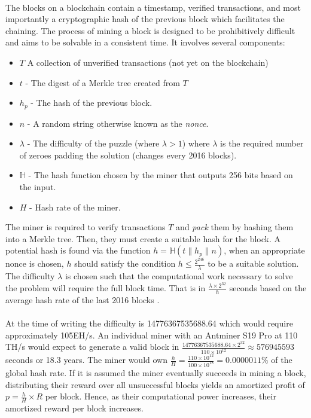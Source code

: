 \paragraph{} The blocks on a blockchain contain a timestamp, verified transactions, and most importantly a cryptographic hash of the previous block which facilitates the chaining. The process of mining a block is designed to be prohibitively difficult and aims to be solvable in a consistent time. It involves several components:

\begin{itemize}
  \item $T$ A collection of unverified transactions (not yet on the blockchain)
  \item $t$ - The digest of a Merkle tree created from $T$
  \item $h_p$ - The hash of the previous block.
  \item $n$ - A random string otherwise known as the \textit{nonce}.
  \item $\lambda$ - The difficulty of the puzzle (where $\lambda > 1$) where $\lambda$ is the required number of zeroes padding the solution (changes every 2016 blocks).
  \item $\mathbb{H}$ - The hash function chosen by the miner that outputs 256 bits based on the input.
  \item $H$ - Hash rate of the miner.
\end{itemize}

\noindent The miner is required to verify transactions $T$ and \textit{pack} them by hashing them into a Merkle tree. Then, they must create a suitable hash for the block. A potential hash is found via the function $h = \mathbb{H}(t \| h_p \| n)$, when an appropriate nonce is chosen, $h$ should satisfy the condition $h \leq \frac{2^{246}}{\lambda}$ to be a suitable solution. The difficulty $\lambda$ is chosen such that the computational work necessary to solve the problem will require the full block time. That is in $\frac{\lambda \times 2^{32}}{h}$ seconds based on the average hash rate of the last 2016 blocks \cite{difficulty2019}.

\paragraph{} At the time of writing the difficulty is 14776367535688.64 \cite{blockexplorer2020} which would require approximately 105EH/s. An individual miner with an Antminer S19 Pro at 110 TH/s \cite{antminer2018} would expect to generate a valid block in $\frac{14776367535688.64 \times 2^{32}}{110 \times 10^12} \approx 576945593$ seconds or 18.3 years. The miner would own $\frac{h}{H} = \frac{110 \times 10^{12}}{100 \times 10^{18}} = 0.0000011\%$ of the global hash rate. If it is assumed the miner eventually succeeds in mining a block, distributing their reward over all unsuccessful blocks yields an amortized profit of $p = \frac{h}{H} \times R$ per block. Hence, as their computational power increases, their amortized reward per block increases.


